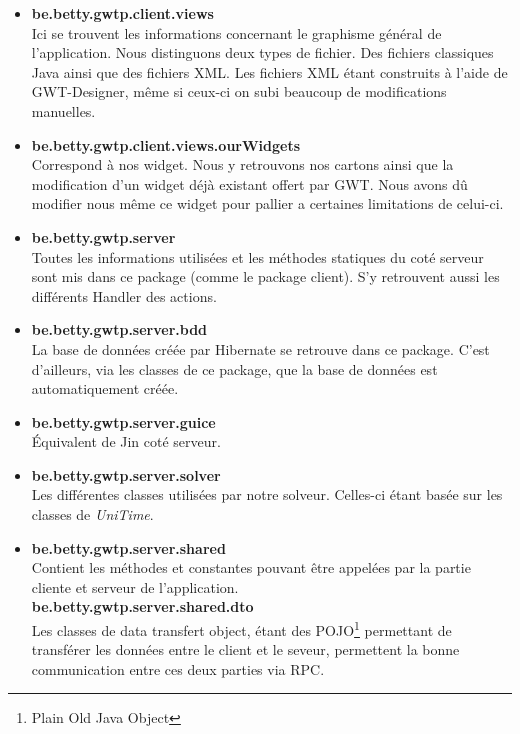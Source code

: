 \begin{itemize}
\item \textbf{be.betty.gwtp.client.views}\\
 Ici se trouvent les informations concernant le graphisme général de l'application. Nous distinguons deux types de fichier. Des fichiers classiques Java ainsi que des fichiers XML. Les fichiers XML étant construits à l'aide de GWT-Designer, même si ceux-ci on subi beaucoup de modifications manuelles.\\
 
 \item \textbf{be.betty.gwtp.client.views.ourWidgets}\\
 Correspond à nos widget. Nous y retrouvons nos cartons ainsi que la modification d'un widget déjà existant offert par GWT. Nous avons dû modifier nous même ce widget pour pallier a certaines limitations de celui-ci.\\
 
 \item \textbf{be.betty.gwtp.server}\\
 Toutes les informations utilisées et les méthodes statiques du coté serveur sont mis dans ce package (comme le package client). S'y retrouvent aussi les différents Handler des actions.\\
 
 \item \textbf{be.betty.gwtp.server.bdd}\\
  La base de données créée par Hibernate se retrouve dans ce package. C'est d'ailleurs, via les classes de ce package, que la base de données est automatiquement créée.\\
  
 \item \textbf{be.betty.gwtp.server.guice}\\
 Équivalent de Jin coté serveur.\\
 
\item \textbf{be.betty.gwtp.server.solver}\\
Les différentes classes utilisées par notre solveur. Celles-ci étant basée sur les classes de \textit{UniTime}.\\

\item \textbf{be.betty.gwtp.server.shared}\\
Contient les méthodes et constantes pouvant être appelées par la partie cliente et serveur de l'application.\\

\textbf{be.betty.gwtp.server.shared.dto}\\
Les classes de data transfert object, étant des POJO\footnote{Plain Old Java Object} permettant de transférer les données entre le client et le seveur, permettent la bonne communication entre ces deux parties via RPC.\\

\end{itemize}

